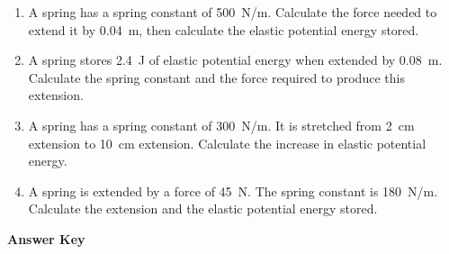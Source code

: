 \documentclass[12pt,a4paper]{article}
\begin{document}
\begin{enumerate}[label=\textbf{\arabic*.}]
\item A spring has a spring constant of \SI{500}{N/m}. Calculate the force needed to extend it by \SI{0.04}{m}, then calculate the elastic potential energy stored.

\item A spring stores \SI{2.4}{J} of elastic potential energy when extended by \SI{0.08}{m}. Calculate the spring constant and the force required to produce this extension.

\item A spring has a spring constant of \SI{300}{N/m}. It is stretched from \SI{2}{cm} extension to \SI{10}{cm} extension. Calculate the increase in elastic potential energy.

\item A spring is extended by a force of \SI{45}{N}. The spring constant is \SI{180}{N/m}. Calculate the extension and the elastic potential energy stored.

\end{enumerate}

\newpage

\begin{center}
    \Large \textbf{Answer Key}
\end{center}
\end{document}
